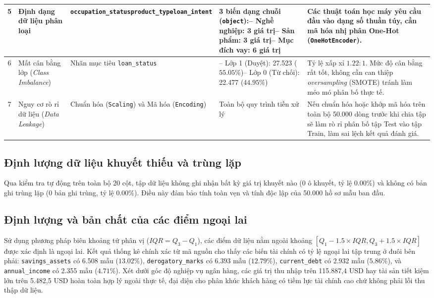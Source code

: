 \documentclass[12pt,a4paper,oneside]{report}
\begin{document}
\begin{table}[H]
{\begin{tabular}{|c|p{2.8cm}|p{3.0cm}|p{4.2cm}|p{5.2cm}|}
    5 & Định dạng dữ liệu phân loại & \texttt{occupation\_status}\newline \texttt{product\_type}\newline \texttt{loan\_intent} & 3 biến dạng chuỗi (\texttt{object}):\newline -- Nghề nghiệp: 3 giá trị\newline -- Sản phẩm: 3 giá trị\newline -- Mục đích vay: 6 giá trị & Các thuật toán học máy yêu cầu đầu vào dạng số thuần túy, cần mã hóa nhị phân One-Hot (\texttt{OneHotEncoder}). \\
    \hline
    6 & Mất cân bằng lớp (\textit{Class Imbalance}) & Nhãn mục tiêu \texttt{loan\_status} & -- Lớp 1 (Duyệt): 27.523 ($55.05\%$)\newline -- Lớp 0 (Từ chối): 22.477 ($44.95\%$) & Tỷ lệ xấp xỉ $1.22 : 1$. Mức độ cân bằng rất tốt, không cần can thiệp \textit{oversampling} (SMOTE) tránh làm méo mó phân bố thực tế. \\
    \hline
    7 & Nguy cơ rò rỉ dữ liệu (\textit{Data Leakage}) & Chuẩn hóa (\texttt{Scaling}) và Mã hóa (\texttt{Encoding}) & Toàn bộ quy trình tiền xử lý & Nếu chuẩn hóa hoặc khớp mã hóa trên toàn bộ 50.000 dòng trước khi chia tập sẽ làm rò rỉ phân bố tập Test vào tập Train, làm sai lệch kết quả đánh giá. \\
    \hline
\end{tabular}%
}
\end{table}

\subsection{Định lượng dữ liệu khuyết thiếu và trùng lặp}
Qua kiểm tra tự động trên toàn bộ 20 cột, tập dữ liệu không ghi nhận bất kỳ giá trị khuyết nào (0 ô khuyết, tỷ lệ $0.00\%$) và không có bản ghi trùng lặp (0 bản ghi trùng, tỷ lệ $0.00\%$). Điều này đảm bảo tính toàn vẹn và tính độc lập của 50.000 hồ sơ mẫu ban đầu.

\subsection{Định lượng và bản chất của các điểm ngoại lai}
Sử dụng phương pháp biên khoảng tứ phân vị ($IQR = Q_3 - Q_1$), các điểm dữ liệu nằm ngoài khoảng $[Q_1 - 1.5 \times IQR, Q_3 + 1.5 \times IQR]$ được xác định là ngoại lai. Kết quả thống kê chính xác từ mã nguồn cho thấy các biến tài chính có tỷ lệ ngoại lai tập trung ở đuôi bên phải: \texttt{savings\_assets} có 6.508 mẫu ($13.02\%$), \texttt{derogatory\_marks} có 6.393 mẫu ($12.79\%$), \texttt{current\_debt} có 2.932 mẫu ($5.86\%$), và \texttt{annual\_income} có 2.355 mẫu ($4.71\%$). Xét dưới góc độ nghiệp vụ ngân hàng, các giá trị thu nhập trên 115.887,4 USD hay tài sản tiết kiệm lớn trên 5.482,5 USD hoàn toàn hợp lý ngoài thực tế, đại diện cho phân khúc khách hàng có tiềm lực tài chính cao chứ không phải lỗi thu thập dữ liệu.
\end{document}
